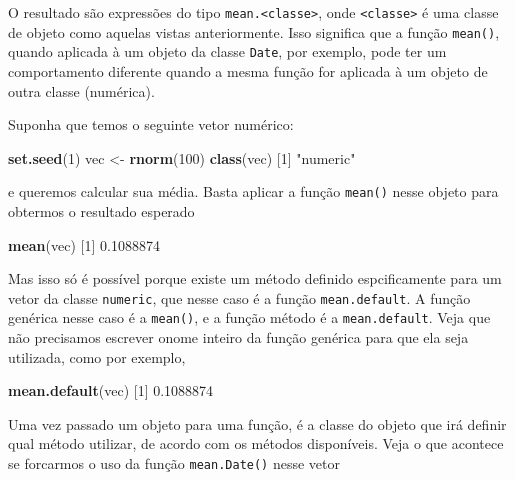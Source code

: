 \documentclass[10pt,a4paper]{book}
\newenvironment{Shaded}{\begin{snugshade}}{\end{snugshade}}
\newcommand{\KeywordTok}[1]{\textcolor[rgb]{0.13,0.29,0.53}{\textbf{#1}}}
\newcommand{\DecValTok}[1]{\textcolor[rgb]{0.00,0.00,0.81}{#1}}
\newcommand{\FloatTok}[1]{\textcolor[rgb]{0.00,0.00,0.81}{#1}}
\newcommand{\StringTok}[1]{\textcolor[rgb]{0.31,0.60,0.02}{#1}}
\newcommand{\NormalTok}[1]{#1}
\begin{document}
O resultado são expressões do tipo
\texttt{mean.\textless{}classe\textgreater{}}, onde
\texttt{\textless{}classe\textgreater{}} é uma classe de objeto como
aquelas vistas anteriormente. Isso significa que a função
\texttt{mean()}, quando aplicada à um objeto da classe \texttt{Date},
por exemplo, pode ter um comportamento diferente quando a mesma função
for aplicada à um objeto de outra classe (numérica).

Suponha que temos o seguinte vetor numérico:

\begin{Shaded}
\begin{Highlighting}[]
\KeywordTok{set.seed}\NormalTok{(}\DecValTok{1}\NormalTok{)}
\NormalTok{vec <-}\StringTok{ }\KeywordTok{rnorm}\NormalTok{(}\DecValTok{100}\NormalTok{)}
\KeywordTok{class}\NormalTok{(vec)}
\NormalTok{[}\DecValTok{1}\NormalTok{] }\StringTok{"numeric"}
\end{Highlighting}
\end{Shaded}

e queremos calcular sua média. Basta aplicar a função \texttt{mean()}
nesse objeto para obtermos o resultado esperado

\begin{Shaded}
\begin{Highlighting}[]
\KeywordTok{mean}\NormalTok{(vec)}
\NormalTok{[}\DecValTok{1}\NormalTok{] }\FloatTok{0.1088874}
\end{Highlighting}
\end{Shaded}

Mas isso só é possível porque existe um método definido espcificamente
para um vetor da classe \texttt{numeric}, que nesse caso é a função
\texttt{mean.default}. A função genérica nesse caso é a \texttt{mean()},
e a função método é a \texttt{mean.default}. Veja que não precisamos
escrever onome inteiro da função genérica para que ela seja utilizada,
como por exemplo,

\begin{Shaded}
\begin{Highlighting}[]
\KeywordTok{mean.default}\NormalTok{(vec)}
\NormalTok{[}\DecValTok{1}\NormalTok{] }\FloatTok{0.1088874}
\end{Highlighting}
\end{Shaded}

Uma vez passado um objeto para uma função, é a classe do objeto que irá
definir qual método utilizar, de acordo com os métodos disponíveis. Veja
o que acontece se forcarmos o uso da função \texttt{mean.Date()} nesse
vetor
\end{document}
